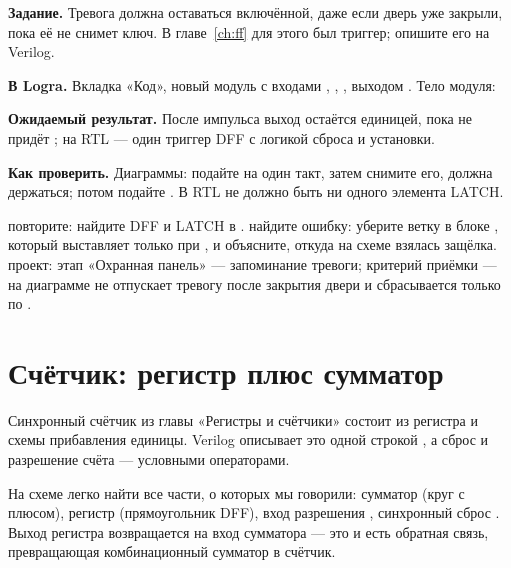 \begin{diybox}
\textbf{Задание.} Тревога должна оставаться включённой, даже если дверь уже закрыли, пока её не снимет ключ. В главе~\ref{ch:ff} для этого был триггер; опишите его на Verilog.

\textbf{В Logra.} Вкладка «Код», новый модуль с входами , , , выходом . Тело модуля: 

\textbf{Ожидаемый результат.} После импульса  выход  остаётся единицей, пока не придёт ; на RTL --- один триггер DFF с логикой сброса и установки.

\textbf{Как проверить.} Диаграммы: подайте  на один такт, затем снимите его,  должна держаться; потом подайте . В RTL не должно быть ни одного элемента LATCH.

 повторите: найдите DFF и LATCH в .  найдите ошибку: уберите ветку  в блоке , который выставляет  только при , и объясните, откуда на схеме взялась защёлка.  проект: этап «Охранная панель» --- запоминание тревоги; критерий приёмки --- на диаграмме  не отпускает тревогу после закрытия двери и сбрасывается только по .
\end{diybox}

\section{Счётчик: регистр плюс сумматор}

Синхронный счётчик из главы «Регистры и счётчики» состоит из регистра и
схемы прибавления единицы. Verilog описывает это одной строкой
, а сброс и разрешение счёта --- условными операторами.



На схеме легко найти все части, о которых мы говорили: сумматор
(круг с плюсом), регистр (прямоугольник DFF), вход разрешения ,
синхронный сброс . Выход регистра возвращается на вход
сумматора --- это и есть обратная связь, превращающая комбинационный
сумматор в счётчик.

